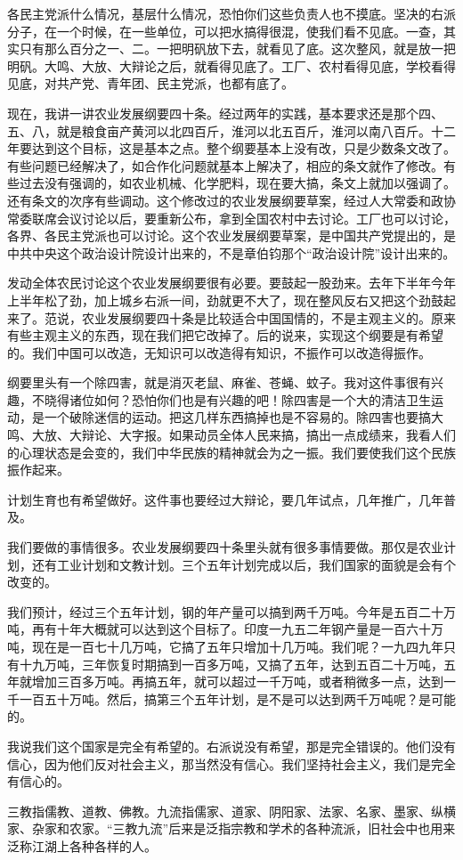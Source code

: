 各民主党派什么情况，基层什么情况，恐怕你们这些负责人也不摸底。坚决的右派分子，在一个时候，在一些单位，可以把水搞得很混，使我们看不见底。一查，其实只有那么百分之一、二。一把明矾放下去，就看见了底。这次整风，就是放一把明矾。大鸣、大放、大辩论之后，就看得见底了。工厂、农村看得见底，学校看得见底，对共产党、青年团、民主党派，也都有底了。

现在，我讲一讲农业发展纲要四十条。经过两年的实践，基本要求还是那个四、五、八，就是粮食亩产黄河以北四百斤，淮河以北五百斤，淮河以南八百斤。十二年要达到这个目标，这是基本之点。整个纲要基本上没有改，只是少数条文改了。有些问题已经解决了，如合作化问题就基本上解决了，相应的条文就作了修改。有些过去没有强调的，如农业机械、化学肥料，现在要大搞，条文上就加以强调了。还有条文的次序有些调动。这个修改过的农业发展纲要草案，经过人大常委和政协常委联席会议讨论以后，要重新公布，拿到全国农村中去讨论。工厂也可以讨论，各界、各民主党派也可以讨论。这个农业发展纲要草案，是中国共产党提出的，是中共中央这个政治设计院设计出来的，不是章伯钧那个“政治设计院”设计出来的。

发动全体农民讨论这个农业发展纲要很有必要。要鼓起一股劲来。去年下半年今年上半年松了劲，加上城乡右派一间，劲就更不大了，现在整风反右又把这个劲鼓起来了。范说，农业发展纲要四十条是比较适合中国国情的，不是主观主义的。原来有些主观主义的东西，现在我们把它改掉了。后的说来，实现这个纲要是有希望的。我们中国可以改造，无知识可以改造得有知识，不振作可以改造得振作。

纲要里头有一个除四害，就是消灭老鼠、麻雀、苍蝇、蚊子。我对这件事很有兴趣，不晓得诸位如何？恐怕你们也是有兴趣的吧！除四害是一个大的清洁卫生运动，是一个破除迷信的运动。把这几样东西搞掉也是不容易的。除四害也要搞大鸣、大放、大辩论、大字报。如果动员全体人民来搞，搞出一点成绩来，我看人们的心理状态是会变的，我们中华民族的精神就会为之一振。我们要使我们这个民族振作起来。

计划生育也有希望做好。这件事也要经过大辩论，要几年试点，几年推广，几年普及。

我们要做的事情很多。农业发展纲要四十条里头就有很多事情要做。那仅是农业计划，还有工业计划和文教计划。三个五年计划完成以后，我们国家的面貌是会有个改变的。

我们预计，经过三个五年计划，钢的年产量可以搞到两千万吨。今年是五百二十万吨，再有十年大概就可以达到这个目标了。印度一九五二年钢产量是一百六十万吨，现在是一百七十几万吨，它搞了五年只增加十几万吨。我们呢？一九四九年只有十九万吨，三年恢复时期搞到一百多万吨，又搞了五年，达到五百二十万吨，五年就增加三百多万吨。再搞五年，就可以超过一千万吨，或者稍微多一点，达到一千一百五十万吨。然后，搞第三个五年计划，是不是可以达到两千万吨呢？是可能的。

我说我们这个国家是完全有希望的。右派说没有希望，那是完全错误的。他们没有信心，因为他们反对社会主义，那当然没有信心。我们坚持社会主义，我们是完全有信心的。


\begin{maonote}
三教指儒教、道教、佛教。九流指儒家、道家、阴阳家、法家、名家、墨家、纵横家、杂家和农家。“三教九流”后来是泛指宗教和学术的各种流派，旧社会中也用来泛称江湖上各种各样的人。
\end{maonote}
